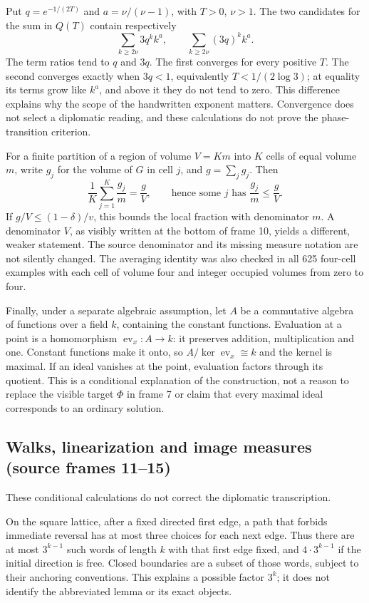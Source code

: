 \documentclass[11pt]{article}
\begin{document}
Put \(q=e^{-1/(2T)}\) and \(a=\nu/(\nu-1)\), with \(T>0\), \(\nu>1\). The two candidates for the sum in \(Q(T)\) contain respectively
\[\sum_{k\ge2\nu}3q^k k^a,\qquad
  \sum_{k\ge2\nu}(3q)^k k^a.\]
The term ratios tend to \(q\) and \(3q\). The first converges for every positive \(T\). The second converges exactly when \(3q<1\), equivalently \(T<1/(2\log3)\); at equality its terms grow like \(k^a\), and above it they do not tend to zero. This difference explains why the scope of the handwritten exponent matters. Convergence does not select a diplomatic reading, and these calculations do not prove the phase-transition criterion.

For a finite partition of a region of volume \(V=Km\) into \(K\) cells of equal volume \(m\), write \(g_j\) for the volume of \(G\) in cell \(j\), and \(g=\sum_jg_j\). Then
\[\frac1K\sum_{j=1}^K\frac{g_j}{m}=\frac gV,\qquad
 \text{hence some }j\text{ has }\frac{g_j}{m}\le\frac gV.\]
If \(g/V\le(1-\delta)/v\), this bounds the local fraction with denominator \(m\). A denominator \(V\), as visibly written at the bottom of frame 10, yields a different, weaker statement. The source denominator and its missing measure notation are not silently changed. The averaging identity was also checked in all 625 four-cell examples with each cell of volume four and integer occupied volumes from zero to four.

Finally, under a separate algebraic assumption, let \(A\) be a commutative algebra of functions over a field \(k\), containing the constant functions. Evaluation at a point is a homomorphism \(\operatorname{ev}_x:A\to k\): it preserves addition, multiplication and one. Constant functions make it onto, so \(A/\ker\operatorname{ev}_x\cong k\) and the kernel is maximal. If an ideal vanishes at the point, evaluation factors through its quotient. This is a conditional explanation of the construction, not a reason to replace the visible target \(\Phi\) in frame 7 or claim that every maximal ideal corresponds to an ordinary solution.


\subsection*{Walks, linearization and image measures (source frames 11--15)}
These conditional calculations do not correct the diplomatic transcription.

On the square lattice, after a fixed directed first edge, a path that forbids immediate reversal has at most three choices for each next edge. Thus there are at most $3^{k-1}$ such words of length $k$ with that first edge fixed, and $4\cdot3^{k-1}$ if the initial direction is free. Closed boundaries are a subset of those words, subject to their anchoring conventions. This explains a possible factor $3^k$; it does not identify the abbreviated lemma or its exact objects.
\end{document}
